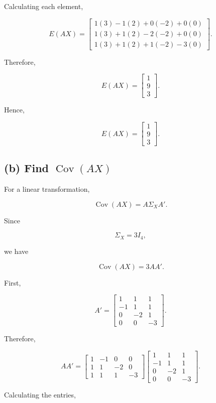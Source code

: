 \documentclass[12pt]{article}
\begin{document}
Calculating each element,

\[
E(AX)
=
\begin{bmatrix}
1(3)-1(2)+0(-2)+0(0)\\
1(3)+1(2)-2(-2)+0(0)\\
1(3)+1(2)+1(-2)-3(0)
\end{bmatrix}.
\]

Therefore,

\[
E(AX)
=
\begin{bmatrix}
1\\
9\\
3
\end{bmatrix}.
\]

Hence,

\[
\boxed{
E(AX)=
\begin{bmatrix}
1\\
9\\
3
\end{bmatrix}
}.
\]

\subsection*{(b) Find $\operatorname{Cov}(AX)$}

For a linear transformation,

\[
\operatorname{Cov}(AX)
=
A\Sigma_XA'.
\]

Since

\[
\Sigma_X=3I_4,
\]

we have

\[
\operatorname{Cov}(AX)
=
3AA'.
\]

First,

\[
A'=
\begin{bmatrix}
1&1&1\\
-1&1&1\\
0&-2&1\\
0&0&-3
\end{bmatrix}.
\]

Therefore,

\[
AA'
=
\begin{bmatrix}
1&-1&0&0\\
1&1&-2&0\\
1&1&1&-3
\end{bmatrix}
\begin{bmatrix}
1&1&1\\
-1&1&1\\
0&-2&1\\
0&0&-3
\end{bmatrix}.
\]

Calculating the entries,
\end{document}
